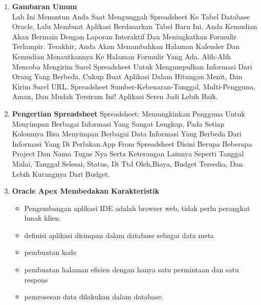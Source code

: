 \documentclass{article}
\begin{document}
\begin{enumerate}
\begin{itemize}
\end{itemize}

\item \textbf{Gambaran Umum}\\Lab Ini Menuntun Anda Saat Mengunggah Spreadsheet Ke Tabel Database Oracle, Lalu Membuat Aplikasi Berdasarkan Tabel Baru Ini. Anda Kemudian Akan Bermain Dengan Laporan Interaktif Dan Meningkatkan Formulir Terlampir. Terakhir, Anda Akan Menambahkan Halaman Kalender Dan Kemudian Menautkannya Ke Halaman Formulir Yang Ada. Alih-Alih Mencoba Mengirim Surel Spreadsheet Untuk Mengumpulkan Informasi Dari Orang Yang Berbeda, Cukup Buat Aplikasi Dalam Hitungan Menit, Dan Kirim Surel URL. Spreadsheet Sumber-Kebenaran-Tunggal, Multi-Pengguna, Aman, Dan Mudah Tersiram Ini! Aplikasi Scren Jadi Lebih Baik.\\
\item \textbf{Pengertian Spreadsheet}
Spreadsheet: Memungkinkan Pengguna Untuk Menyimpan Berbagai Informasi Yang Sangat Lengkap, Pada Setiap Kolomnya Bisa Menyimpan Berbagai Data Informasi Yang Berbeda Dari Informasi Yang Di Perlukan.App From Spreadsheet Disini Berupa Beberapa Project Dan Nama Tugas Nya Serta Keterangan Lainnya Seperti Tanggal Mulai, Tanggal Selesai, Status, Di Ttd Oleh,Biaya, Budget Tersedia, Dan Lebih Kurangnya Dari Budget.\\

\item \textbf{Oracle Apex Membedakan Karakteristik}
\begin{itemize}
\item Pengembangan aplikasi IDE adalah browser web, tidak perlu perangkat lunak klien.
\item definisi aplikasi disimpan dalam database sebagai data meta
\item pembuatan kode
\item pembuatan halaman efisien dengan hanya satu permintaan dan satu respons
\item pemrosesan data dilakukan dalam database.
\end{itemize}


\end{enumerate}
\end{document}
